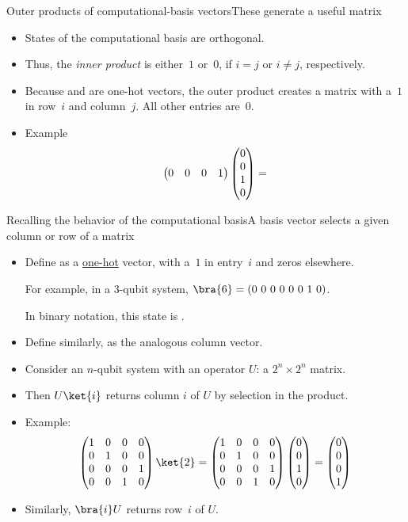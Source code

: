 \begin{frame}{Outer products of computational-basis vectors}{These generate a useful matrix}
\begin{itemize}[<+->]
    \item States of the computational basis are orthogonal.
    \item Thus, the \emph{inner product}  is either~$1$ or~$0$, if $i=j$ or $i\not=j$, respectively.
    \item Because  and  are one-hot vectors, the outer product  creates a matrix with a~$1$ in row~$i$ and column~$j$.  All other entries are~$0$.
    \item Example
    \[ \CDQB{0}{0}{0}{1}\DQB{0}{0}{1}{0} =\]
\end{itemize}
\end{frame}

\begin{frame}{Recalling the behavior of the computational basis}{A basis vector selects a given column or row of a matrix}
\begin{itemize}[<+->]
    \item Define  as a \href{https://en.wikipedia.org/wiki/One-hot}{one-hot} vector, with a~$1$ in entry~$i$ and zeros elsewhere.  
    
    For example, in a 3-qubit system, $\bra{6} = (0\ 0\ 0\ 0\ 0\ 0\ 1\ 0)$.  
    
    In binary notation, this state is .
    \item Define  similarly, as the analogous column vector.
    \item Consider an $n$-qubit system with an operator $U$: a $2^{n}\times 2^{n}$ matrix.
    \item Then $U\ket{i}$ returns column $i$ of $U$ by selection in the product.
    \item Example:
    \[ \CNOTMatrix\ket{2} = \CNOTMatrix\DQB{0}{0}{1}{0} = \DQB{0}{0}{0}{1}\]
    \item Similarly, $\bra{i}U$ returns row~$i$ of $U$.
\end{itemize}
\end{frame}

